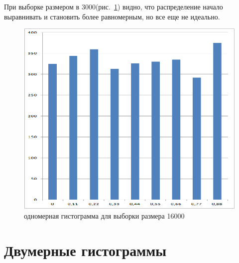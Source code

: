 \documentclass[a4paper,12pt]{article}
\begin{document}
При выборке размером в 3000(рис.~\ref{fig:im2D_3}) видно, что распределение начало выравнивать и становить более равномерным, но все еще не идеально.
\begin{center}
	\begin{figure}[h]
		\centering
   		\includegraphics[scale=0.25]{figure_3.png}
   		\caption{одномерная гистограмма для выборки размера 16000}
   		\label{fig:im2D_3}
    \end{figure}
\end{center}

\newpage\section{Двумерные гистограммы} 
\end{document}
